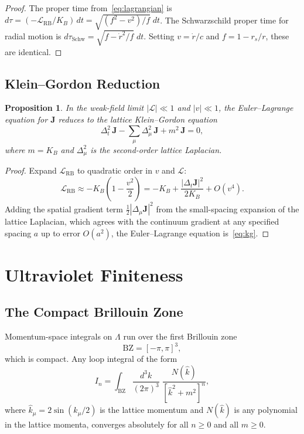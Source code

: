 \documentclass[12pt,a4paper]{article}
\newtheorem{proposition}[theorem]{Proposition}
\begin{document}
\begin{proof}
The proper time from~\eqref{eq:lagrangian} is $d\tau = (-\mathcal{L}_{\mathrm{RB}}/K_{B})\,dt = \sqrt{(f^{2} - v^{2})/f}\;dt$. The Schwarzschild proper time for radial motion is $d\tau_{\mathrm{Schw}} = \sqrt{f - \dot{r}^{2}/f}\;dt$. Setting $v = \dot{r}/c$ and $f = 1 - r_{s}/r$, these are identical.
\end{proof}

\subsection{Klein--Gordon Reduction}

\begin{proposition}\label{prop:kg}
In the weak-field limit $|\mathcal{L}| \ll 1$ and $|v| \ll 1$, the Euler--Lagrange equation for $\mathbf{J}$ reduces to the lattice Klein--Gordon equation
\begin{equation}\label{eq:kg}
\Delta_{t}^{2}\,\mathbf{J} - \sum_{\mu}\Delta_{\mu}^{2}\,\mathbf{J} + m^{2}\,\mathbf{J} = 0,
\end{equation}
where $m = K_{B}$ and $\Delta_{\mu}^{2}$ is the second-order lattice Laplacian.
\end{proposition}

\begin{proof}
Expand $\mathcal{L}_{\mathrm{RB}}$ to quadratic order in $v$ and $\mathcal{L}$:
\[
\mathcal{L}_{\mathrm{RB}} \approx -K_{B}\left(1 - \frac{v^{2}}{2}\right) = -K_{B} + \frac{|\Delta_{t}\mathbf{J}|^{2}}{2K_{B}} + O(v^{4}).
\]
Adding the spatial gradient term $\frac{1}{2}|\Delta_{\mu}\mathbf{J}|^{2}$ from the small-spacing expansion of the lattice Laplacian, which agrees with the continuum gradient at any specified spacing $a$ up to error $O(a^{2})$, the Euler--Lagrange equation is~\eqref{eq:kg}.
\end{proof}

\section{Ultraviolet Finiteness}\label{sec:uv}

\subsection{The Compact Brillouin Zone}

Momentum-space integrals on $\Lambda$ run over the first Brillouin zone
\begin{equation}\label{eq:bz}
\mathrm{BZ} = \left[-\pi, \pi\right]^{3},
\end{equation}
which is compact. Any loop integral of the form
\begin{equation}\label{eq:loop}
I_{n} = \int_{\mathrm{BZ}} \frac{d^{3}k}{(2\pi)^{3}}\;\frac{N(\hat{k})}{\left[\hat{k}^{2} + m^{2}\right]^{n}},
\end{equation}
where $\hat{k}_{\mu} = 2\sin(k_{\mu}/2)$ is the lattice momentum and $N(\hat{k})$ is any polynomial in the lattice momenta, converges absolutely for all $n \geq 0$ and all $m \geq 0$.
\end{document}
